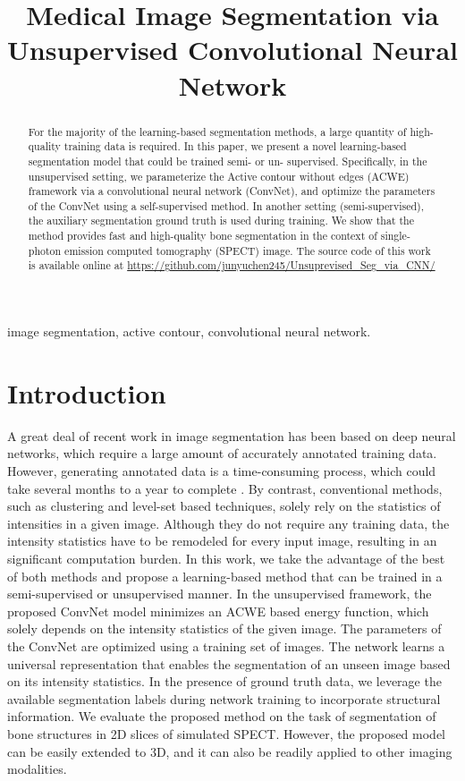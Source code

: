 \documentclass{midl}
\title[Medical Image Segmentation via Unsupervised Convolutional Neural Network]{Medical Image Segmentation via Unsupervised Convolutional Neural Network}
\begin{document}
\maketitle

\begin{abstract}
For the majority of the learning-based segmentation methods, a large quantity of high-quality training data is required. In this paper, we present a novel learning-based segmentation model that could be trained semi- or un- supervised. Specifically, in the unsupervised setting, we parameterize the Active contour without edges (ACWE) framework via a convolutional neural network (ConvNet), and optimize the parameters of the ConvNet using a self-supervised method. In another setting (semi-supervised), the auxiliary segmentation ground truth is used during training. We show that the method provides fast and high-quality bone segmentation in the context of single-photon emission computed tomography (SPECT) image. The source code of this work is available online at \url{https://github.com/junyuchen245/Unsuprevised_Seg_via_CNN/}
\end{abstract}

\begin{keywords}
image segmentation, active contour, convolutional neural network.
\end{keywords}

\section{Introduction}
A great deal of recent work in image segmentation has been based on deep neural networks, which require a large amount of accurately annotated training data. However, generating annotated data is a time-consuming process, which could take several months to a year to complete \cite{Segars2013}.  By contrast, conventional methods, such as clustering \cite{Chen2019} and level-set \cite{Chan2001} based techniques, solely rely on the statistics of intensities in a given image. Although they do not require any training data, the intensity statistics have to be remodeled for every input image, resulting in an significant computation burden.  In this work, we take the advantage of the best of both methods and propose a learning-based method that can be trained in a semi-supervised or unsupervised manner. In the unsupervised framework, the proposed ConvNet model minimizes an ACWE \cite{Chan2001} based energy function, which solely depends on the intensity statistics of the given image. The parameters of the ConvNet are optimized using a training set of images. The network learns a universal representation that enables the segmentation of an unseen image based on its intensity statistics. In the presence of ground truth data, we leverage the available segmentation labels during network training to incorporate structural information. We evaluate the proposed method on the task of segmentation of bone structures in 2D slices of simulated SPECT. However, the proposed model can be easily extended to 3D, and it can also be readily applied to other imaging modalities.
\end{document}
